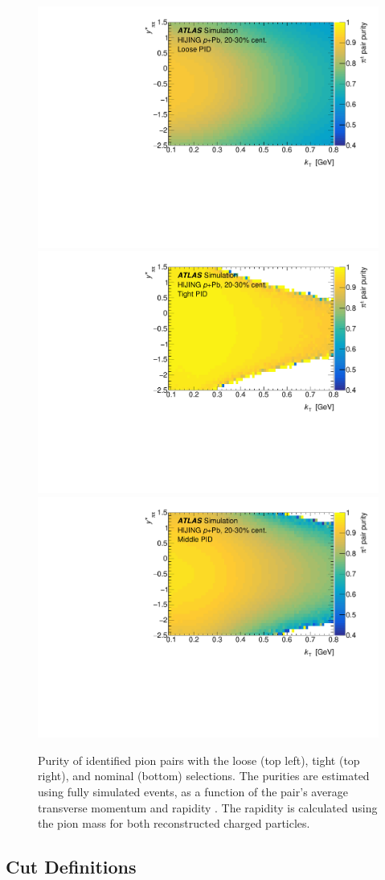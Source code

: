 \begin{figure}[ht]
\centering
\includegraphics[width=.49\linewidth]{pid_pur_loose_kt_eta.pdf}
\includegraphics[width=.49\linewidth]{pid_pur_tight_kt_eta.pdf}\\
\includegraphics[width=.6\linewidth]{pid_pur_mid_kt_eta.pdf}\\
\caption{Purity of identified pion pairs with the loose (top left), tight (top right), and nominal (bottom) \pid selections. The purities are estimated using fully simulated \Hijing \pPb events, as a function of the pair's average transverse momentum \kt and rapidity \kys. The rapidity is calculated using the pion mass for both reconstructed charged particles.}
\label{fig:pid_purity}
\end{figure}


\subsection{Cut Definitions}
